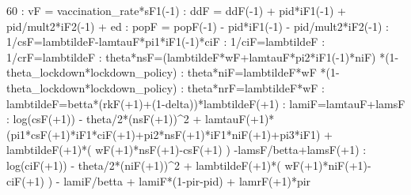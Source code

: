 \documentclass{article}%
\begin{document}
 60   :  vF = vaccination\_rate*sF1({-}1)\newline%
   :  ddF = ddF({-}1) + pid*iF1({-}1) + pid/mult2*iF2({-}1) + ed\newline%
   :  popF = popF({-}1) {-} pid*iF1({-}1) {-} pid/mult2*iF2({-}1)\newline%
   :  1/csF=lambtildeF{-}lamtauF*pi1*iF1({-}1)*ciF\newline%
   :  1/ciF=lambtildeF\newline%
   :  1/crF=lambtildeF\newline%
   :  theta*nsF=(lambtildeF*wF+lamtauF*pi2*iF1({-}1)*niF) *(1{-}theta\_lockdown*lockdown\_policy)\newline%
   :  theta*niF=lambtildeF*wF *(1{-}theta\_lockdown*lockdown\_policy)\newline%
   :  theta*nrF=lambtildeF*wF\newline%
   :  lambtildeF=betta*(rkF(+1)+(1{-}delta))*lambtildeF(+1)\newline%
   :  lamiF=lamtauF+lamsF\newline%
   :  log(csF(+1)) {-} theta/2*(nsF(+1))\^{}2 + lamtauF(+1)*(pi1*csF(+1)*iF1*ciF(+1)+pi2*nsF(+1)*iF1*niF(+1)+pi3*iF1) + lambtildeF(+1)*( wF(+1)*nsF(+1){-}csF(+1) ) {-}lamsF/betta+lamsF(+1)\newline%
   :  log(ciF(+1)) {-} theta/2*(niF(+1))\^{}2 + lambtildeF(+1)*( wF(+1)*niF(+1){-}ciF(+1) ) {-} lamiF/betta + lamiF*(1{-}pir{-}pid) + lamrF(+1)*pir\newline%
\end{document}

